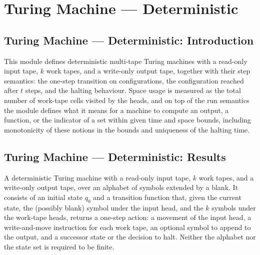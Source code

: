 \section{Turing Machine --- Deterministic}
\subsection*{Turing Machine --- Deterministic: Introduction}

This module defines deterministic multi-tape Turing machines with a read-only
input tape, $k$ work tapes, and a write-only output tape, together with their
step semantics: the one-step transition on configurations, the configuration
reached after $t$ steps, and the halting behaviour.  Space usage is measured
as the total number of work-tape cells visited by the heads, and on top of the
run semantics the module defines what it means for a machine to compute an
output, a function, or the indicator of a set within given time and space
bounds, including monotonicity of these notions in the bounds and uniqueness
of the halting time.

\subsection*{Turing Machine --- Deterministic: Results}

\begin{definition}
\label{Turing.MultiTapeTM}
\leanok
{}
A deterministic Turing machine with a read-only input tape, $k$ work tapes,
and a write-only output tape, over an alphabet of symbols extended by a blank.
It consists of an initial state $q_0$ and a transition function that, given
the current state, the (possibly blank) symbol under the input head, and the
$k$ symbols under the work-tape heads, returns a one-step action: a movement
of the input head, a write-and-move instruction for each work tape, an
optional symbol to append to the output, and a successor state or the decision
to halt.  Neither the alphabet nor the state set is required to be finite.
\end{definition}

